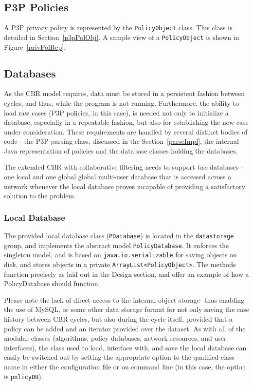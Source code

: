 \subsection{P3P Policies}  
A P3P privacy policy is represented by the \texttt{PolicyObject} class. This class is detailed in Section~\ref{p3pPolObj}. A sample view of a \texttt{PolicyObject} is shown in Figure~\ref{privPolRep}.

\subsection{Databases}

As the CBR model requires, data must be stored in a persistent fashion between cycles, and thus, while the program is not running. Furthermore, the ability to load raw cases (P3P policies, in this case), is needed not only to initialize a database, especially in a repeatable fashion, but also for establishing the new case under consideration. These requirements are handled by several distinct bodies of code - the P3P parsing class, discussed in the Section~\ref{parseImpl}, the internal Java representation of policies and the database classes holding the databases. 

The extended CBR with collaborative filtering needs to support \emph{two} databases - one local and one global global multi-user database that is accessed across a network whenever the local database proves incapable of providing a satisfactory solution to the problem.

\subsubsection{Local Database}
The provided local database class (\texttt{PDatabase}) is located in the \texttt{datastorage} group, and implements the abstract model \texttt{PolicyDatabase}. It enforces the singleton model, and is based on \texttt{java.io.serializable} for saving objects on disk, and stores objects in a private \texttt{ArrayList<PolicyObject>}. The methods function precisely as laid out in the Design section, and offer an example of how a PolicyDatabase should function.

Please note the lack of direct access to the internal object storage- thus enabling the use of MySQL, or some other data storage format for not only saving the case history between CBR cycles, but also during the cycle itself, provided that a policy can be added and an iterator provided over the dataset. As with all of the modular classes (algorithms, policy databases, network resources, and user interfaces), the class used to load, interface with, and save the local database can easily be switched out by setting the appropriate  option to the qualified class name in either the configuration file or on command line (in this case, the option is \texttt{policyDB}).

